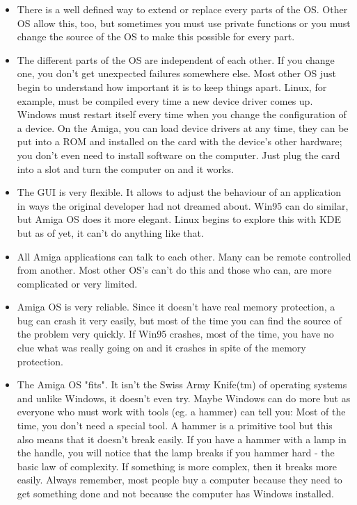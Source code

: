 \begin{itemize}
\item There is a well defined way to extend or replace every parts of the OS.
Other OS allow this, too, but sometimes you must use private functions or
you must change the source of the OS to make this possible for every part.

\item The different parts of the OS are independent of each other.
If you change one, you don't get unexpected failures somewhere else.
Most other OS just begin to understand how important it is to keep
things apart. Linux, for example, must be compiled every time a new
device driver comes up. Windows must restart itself every time when
you change the configuration of a device. On the Amiga, you can load
device drivers at any time, they can be put into a ROM and installed on the
card with the device's other hardware; you don't even need to install
software on the computer. Just plug the card into a slot and turn
the computer on and it works.

\item The GUI is very flexible. It allows to adjust the behaviour of
an application in ways the original developer had not dreamed about.
Win95 can do similar, but Amiga OS does it more elegant. Linux begins to
explore this with KDE but as of yet, it can't do anything like that.

\item All Amiga applications can talk to each other. Many can be remote
controlled from another. Most other OS's can't do this and those who can,
are more complicated or very limited.

\item Amiga OS is very reliable. Since it doesn't have real memory
protection, a bug can crash it very easily, but most of the time you can
find the source of the problem very quickly. If Win95 crashes, most of the
time, you have no clue what was really going on and it crashes in spite
of the memory protection.

\item The Amiga OS "fits". It isn't the Swiss Army Knife(tm) of operating
systems and unlike Windows, it doesn't even try. Maybe Windows can do more
but as everyone who must work with tools (eg. a hammer) can tell you: Most
of the time, you don't need a special tool. A hammer is a primitive tool
but this also means that it doesn't break easily. If you have a hammer
with a lamp in the handle, you will notice that the lamp breaks if you
hammer hard - the basic law of complexity. If something is more complex,
then it breaks more easily. Always remember, most people buy a computer
because they need to get something done and not because the computer has
Windows installed.

\end{itemize}

